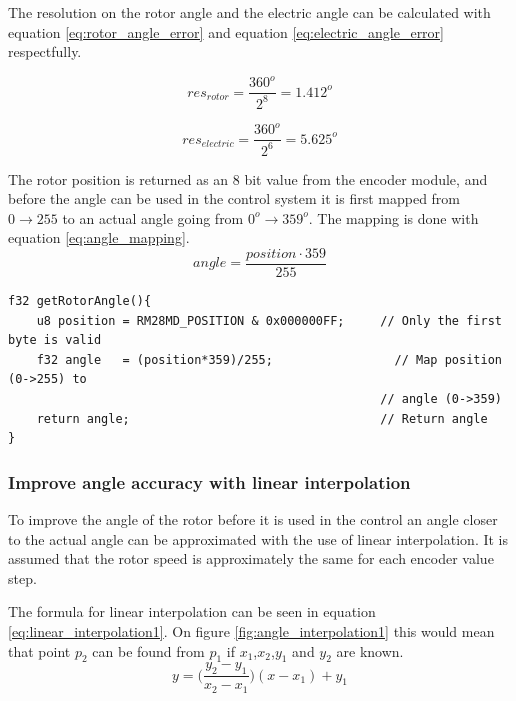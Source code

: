 The resolution on the rotor angle and the electric angle can be calculated with equation \ref{eq:rotor_angle_error} and equation \ref{eq:electric_angle_error} respectfully. 

\begin{equation}
res_{rotor} = \frac{360^o}{2^8} = 1.412^o
\label{eq:rotor_angle_error}
\end{equation}

\begin{equation}
res_{electric} = \frac{360^o}{2^6} = 5.625^o
\label{eq:electric_angle_error}
\end{equation}




The rotor position is returned as an 8 bit value from the encoder module, and before the angle can be used in the control system it is first mapped from $0 \rightarrow 255$ to an actual angle going from $0^o \rightarrow 359^o$. The mapping is done with equation \ref{eq:angle_mapping}.
\begin{equation}
    angle = \frac{position \cdot 359}{255}
    \label{eq:angle_mapping}
\end{equation}



\begin{lstlisting}[style=c, caption=Function to read an angle from the encoder. The angle is returned in degrees., label=code:encoder_angle_function]
f32 getRotorAngle(){
    u8 position = RM28MD_POSITION & 0x000000FF;     // Only the first byte is valid
    f32 angle   = (position*359)/255;       	      // Map position (0->255) to 
                                                    // angle (0->359)
    return angle;                                   // Return angle
}
\end{lstlisting}


\subsubsection{Improve angle accuracy with linear interpolation}

To improve the angle of the rotor before it is used in the control an angle closer to the actual angle can be approximated with the use of linear interpolation. It is assumed that the rotor speed is approximately the same for each encoder value step.


The formula for linear interpolation can be seen in equation \ref{eq:linear_interpolation1}. On figure \ref{fig:angle_interpolation1} this would mean that point $p_2$ can be found from $p_1$ if $x_1$,$x_2$,$y_1$ and $y_2$ are known.
\begin{equation}
    y = \Big( \frac{y_2-y_1}{x_2-x_1} \Big)(x-x_1)+y_1
    \label{eq:linear_interpolation1}
\end{equation}

